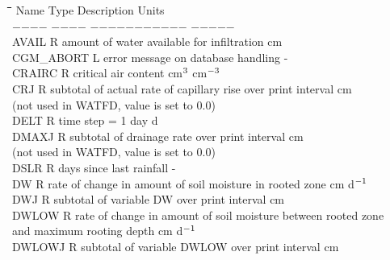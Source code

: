 \documentclass[11pt]{article}
\begin{document}
\begin{tabbing}
\hspace{1.27cm}\=\hspace{1.27cm}\=\hspace{1.27cm}\=\hspace{1.27cm}\=%
\hspace{1.27cm}\=\hspace{1.27cm}\=\hspace{1.27cm}\=\hspace{1.27cm}\=%
\hspace{1.27cm}\=\hspace{1.27cm}\=\kill
Name    \> \> Type   \> Description                                        \> \> \> \> \> \> \> Units\\
$-$$-$$-$$-$    \> \> $-$$-$$-$$-$   \> $-$$-$$-$$-$$-$$-$$-$$-$$-$$-$$-$                                        \> \> \> \> \> \> \> $-$$-$$-$$-$$-$\\
AVAIL\> \> R\> amount of water available for infiltration\> \> \> \> \> \> \> cm\\
CGM\_ABORT\> \> L\> error message on database handling\> \> \> \> \> \> \> -\\
CRAIRC\> \> R\> critical air content\> \> \> \> \> \> \> cm$^{{\rm 3}}$ cm$^{{\rm -3}}$\\
CRJ\> \> R\> subtotal of actual rate of capillary rise over print interval\> \> \> \> \> \> \> cm\\
\>\> \> (not used in WATFD, value is set to 0.0)\\
DELT\> \> R\> time step = 1 day\> \> \> \> \> \> \> d\\
DMAXJ\> \> R\> subtotal of drainage rate over print interval\> \> \> \> \> \> \> cm\\
\>\> \> (not used in WATFD, value is set to 0.0)\\
DSLR\> \> R\> days since last rainfall\> \> \> \> \> \> \> -\\
DW\> \> R\> rate of change in amount of soil moisture in rooted zone\> \> \> \> \> \> \> cm d$^{{\rm -1}}$\\
DWJ\> \> R\> subtotal of variable DW over print interval\> \> \> \> \> \> \> cm  \\
DWLOW\> \> R\> rate of change in amount of soil moisture between rooted zone \\
\>\> \> and maximum rooting depth\> \> \> \> \> \> \> cm d$^{{\rm -1}}$\\
DWLOWJ\> \> R\> subtotal of variable DWLOW over print interval\> \> \> \> \> \> \> cm \\

\end{tabbing}
\end{document}
